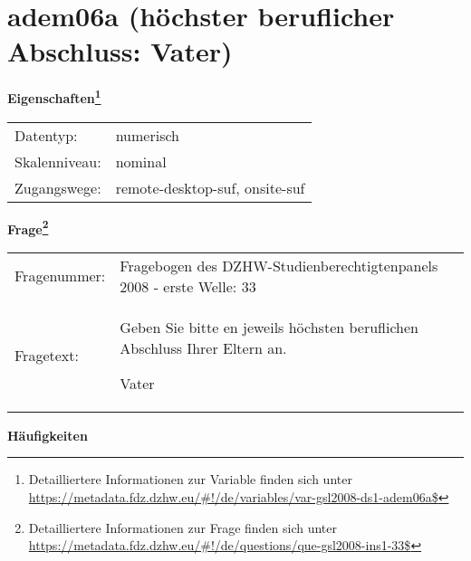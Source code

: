 
    \setcounter{footnote}{0}

    \vspace*{-1.8cm}
	\section{adem06a (höchster beruflicher Abschluss: Vater)}
	\label{section:adem06a}



    \vspace*{0.5cm}
    \noindent\textbf{Eigenschaften\footnote{Detailliertere Informationen zur Variable finden sich unter
		\url{https://metadata.fdz.dzhw.eu/\#!/de/variables/var-gsl2008-ds1-adem06a$}}}\\
	\begin{tabularx}{\hsize}{@{}lX}
	Datentyp: & numerisch \\
	Skalenniveau: & nominal \\
	Zugangswege: &
	  remote-desktop-suf, 
	  onsite-suf
 \\
    \end{tabularx}



				\vspace*{0.5cm}
                \noindent\textbf{Frage\footnote{Detailliertere Informationen zur Frage finden sich unter
		              \url{https://metadata.fdz.dzhw.eu/\#!/de/questions/que-gsl2008-ins1-33$}}}\\
				\begin{tabularx}{\hsize}{@{}lX}
					Fragenummer: &
					  Fragebogen des DZHW-Studienberechtigtenpanels 2008 - erste Welle:
					  33
 \\
					Fragetext: & Geben Sie bitte en jeweils höchsten beruflichen Abschluss Ihrer Eltern an.\par  Vater \\
				\end{tabularx}





        		\vspace*{0.5cm}
                \noindent\textbf{Häufigkeiten}


